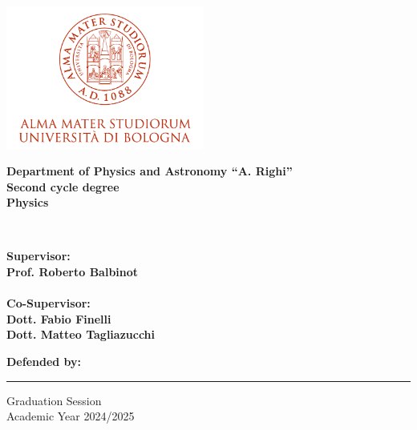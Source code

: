 \begin{titlepage}
    \begin{center}
        \includegraphics[width=65mm]{Logo Unibo.png}
        \vspace{7mm}
        
        {{\bf Department of Physics and Astronomy “A. Righi”\\\vspace{4mm}
        Second cycle degree \\\vspace{7mm}
        \large Physics}}
        \end{center}
        \vspace{23mm}
        \begin{center}
        {\LARGE{\bf \Title}}\\
        \end{center}
        \vspace{50mm} \par \noindent
        \begin{minipage}[t]{0.47\textwidth}
        {\large{\bf Supervisor: \vspace{2mm}\\
        Prof. Roberto Balbinot}\\\\
        \bf Co-Supervisor:
        \vspace{2mm}\\
        Dott. Fabio Finelli\\
        Dott. Matteo Tagliazucchi
        \\}
        \end{minipage}
        \hfill
        \begin{minipage}[t]{0.47\textwidth}\raggedleft 
        {\large{\bf Defended by:
        \vspace{2mm}\\
        \Author   }}
        \end{minipage}
        \vspace{30mm}
        \begin{center}
        \rule[0.5cm]{15.8cm}{0.6mm}
        Graduation Session \\
        Academic Year 2024/2025 
        \end{center}
    \end{titlepage}